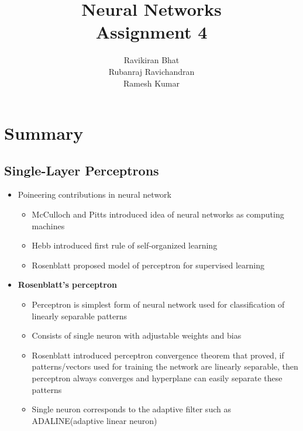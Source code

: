 \documentclass[12pt]{article}
\title{\Huge Neural Networks \\
[6mm]
Assignment 4\\}
\author{Ravikiran Bhat\\
Rubanraj Ravichandran\\
Ramesh Kumar}
\begin{document}
\maketitle
\newpage
\section{Summary}
 
\subsection{Single-Layer Perceptrons}

\begin{itemize}
	\item Poineering contributions in neural network
		\begin{itemize}
			\item McCulloch and Pitts introduced idea of neural networks as computing machines
			\item Hebb introduced first rule of self-organized learning
			\item Rosenblatt proposed model of perceptron for supervised learning
		\end{itemize}
	\item  \textbf{Rosenblatt's perceptron}
		\begin{itemize}
			\item Perceptron is simplest form of neural network used for classification of linearly separable patterns
			\item Consists of single neuron with adjustable weights and bias
			\item Rosenblatt introduced perceptron convergence theorem that proved, if patterns/vectors used for training the network are linearly separable, then perceptron always converges and hyperplane can easily separate these patterns
			\item Single neuron corresponds to the adaptive filter such as ADALINE(adaptive linear neuron)
		\end{itemize}
\end{itemize}
\end{document}
